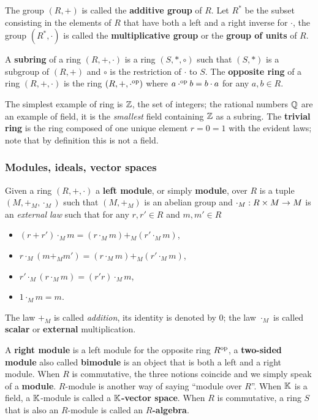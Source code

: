 The group $(R,+)$ is called the \textbf{additive
  group} of $R$. Let $R^\ast$ be the subset consisting in the elements
of $R$ that have both a left and a right inverse for $\cdot$, the
group $(R^\ast,\cdot)$ is called the
\textbf{multiplicative group} or the
\textbf{group of units} of $R$.

A \textbf{subring} of a ring $(R,+,\cdot)$ is a ring
$(S,\ast,\circ)$ such that $(S,\ast)$ is a subgroup of $(R,+)$ and
$\circ$ is the restriction of $\cdot$ to $S$.  The
\textbf{opposite ring}
of a ring $(R,+,\cdot)$ is the ring $(R,+,\cdot^{\mathrm{op}})$
where $a\cdot^{\mathrm{op}} b=b\cdot a$ for any $a,b\in R$.

The simplest example of ring is $\mathbb{Z}$, the set of integers; the
rational numbers $\mathbb{Q}$ are an example of field, it is the
\emph{smallest} field containing $\mathbb{Z}$ as a subring. The
\textbf{trivial ring} is the ring composed of one
unique element $r=0=1$ with the evident laws; note that by definition
this is not a field.

\subsubsection{Modules, ideals, vector spaces}

Given a ring $(R,+,\cdot)$ a \textbf{left
  module}, or simply \textbf{module}, over $R$ is a tuple $(M, +_M,
\cdot_M)$ such that $(M,+_M)$ is an abelian group and $\cdot_M:R\times
M\rightarrow M$ is an \emph{external law} such that for any $r,r'\in R$ and
$m,m'\in R$
\begin{itemize}
\item $(r + r')\cdot_M m = (r \cdot_M m) +_M (r'\cdot_M m)$,
\item $r\cdot_M(m +_M m') = (r\cdot_M m) +_M (r'\cdot_M m)$,
\item $r'\cdot_M(r\cdot_M m ) = (r'r)\cdot_M m$,
\item $1\cdot_M m = m$.
\end{itemize}
The law $+_M$ is called \emph{addition}, its identity is denoted by
$0$; the law $\cdot_M$ is called
\textbf{scalar}
or
\textbf{external}
multiplication. 

A \textbf{right module} is a left module
for the opposite ring $R^{\mathrm{op}}$, a
\textbf{two-sided module} also called
\textbf{bimodule} is an object that is both a left and
a right module. When $R$ is commutative, the three notions coincide
and we simply speak of a \textbf{module}.  $R$-module is
another way of saying ``module over $R$''. When $\mathbb{K}$ is a field, a
$\mathbb{K}$-module is called a \textbf{$\mathbb{K}$-vector
  space}. When $R$ is commutative, a ring $S$ that is also an
$R$-module is called an \textbf{$R$-algebra}.

